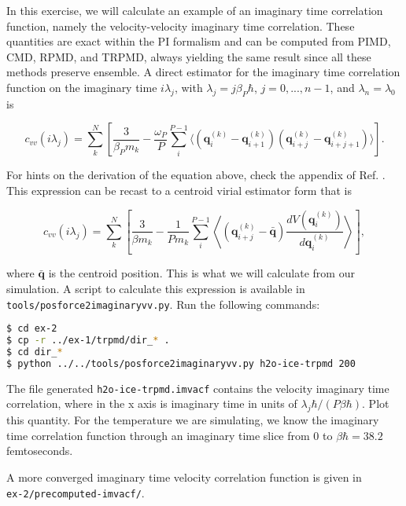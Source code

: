\documentclass{article}
\begin{document}
\begin{Exercise}[label={imaginarytime},title={Velocity imaginary time correlation function}]

In this exercise, we will calculate an example of an imaginary time correlation function, namely the velocity-velocity imaginary time correlation. These quantities are exact within the PI formalism and can be computed from PIMD, CMD, RPMD, and TRPMD, always yielding the same result since all these methods preserve ensemble. A direct estimator for the imaginary time correlation function on the imaginary time $i \lambda_j$, with $\lambda_j=j\beta_P\hbar$, $j=0,...,n-1$, and $\lambda_n=\lambda_0$ is

\begin{equation}
c_{vv}(i \lambda_j ) = \sum_k^N \left[ \frac{3}{\beta_P m_k} - \frac{\omega_P}{P} \sum_i^{P-1} \langle (\mathbf{q}_i^{(k)}-\mathbf{q}_{i+1}^{(k)})(\mathbf{q}_{i+j}^{(k)}-\mathbf{q}_{i+j+1}^{(k)}) \rangle\right].
\end{equation}

For hints on the derivation of the equation above, check the appendix of Ref. \cite{habe+07jcp}. This expression can be recast to a centroid virial estimator form that is


\begin{equation}
c_{vv}(i \lambda_j ) = \sum_k^N \left[ \frac{3}{\beta m_k} - \frac{1}{P m_k} \sum_i^{P-1} \left\langle (\mathbf{q}_{i+j}^{(k)}-\bar{\mathbf{q}})  \frac{dV(\mathbf{q}_i^{(k)})}{d \mathbf{q}_i^{(k)}} \right\rangle\right],
\end{equation}

\noindent where $\bar{\mathbf{q}}$ is the centroid position. This is what we will calculate from our simulation. A script to calculate this expression is available in \texttt{tools/posforce2imaginaryvv.py}. Run the following commands:

\begin{lstlisting}[language=Bash,emph={\$}]
$ cd ex-2
$ cp -r ../ex-1/trpmd/dir_* .
$ cd dir_*
$ python ../../tools/posforce2imaginaryvv.py h2o-ice-trpmd 200
\end{lstlisting}

The file generated \texttt{h2o-ice-trpmd.imvacf} contains the velocity imaginary time correlation, where in the x axis is imaginary time in units of $\lambda_j \hbar/(P \beta \hbar)$. Plot this quantity. For the temperature we are simulating, we know the imaginary time correlation function through an imaginary time slice from $0$ to $\beta \hbar = 38.2$ femtoseconds. 

A more converged imaginary time velocity correlation function is given in \\
\texttt{ex-2/precomputed-imvacf/}.

\end{Exercise}
\end{document}
